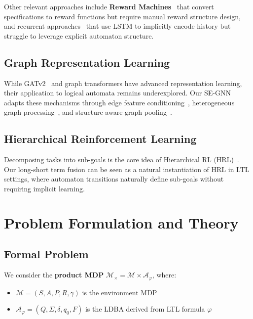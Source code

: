 \documentclass[conference]{IEEEtran}
\begin{document}
Other relevant approaches include \textbf{Reward Machines}~\cite{liu2021reward} that convert specifications to reward functions but require manual reward structure design, and recurrent approaches~\cite{he2022learning} that use LSTM to implicitly encode history but struggle to leverage explicit automaton structure.

\subsection{Graph Representation Learning}

While GATv2~\cite{velickovic2021gat} and graph transformers have advanced representation learning, their application to logical automata remains underexplored. Our SE-GNN adapts these mechanisms through edge feature conditioning~\cite{velickovic2021gat}, heterogeneous graph processing~\cite{wang2021deeper}, and structure-aware graph pooling~\cite{lee2022self}.

\subsection{Hierarchical Reinforcement Learning}

Decomposing tasks into sub-goals is the core idea of Hierarchical RL (HRL)~\cite{sutton1999between,nachum2018conditional}. Our long-short term fusion can be seen as a natural instantiation of HRL in LTL settings, where automaton transitions naturally define sub-goals without requiring implicit learning.

\section{Problem Formulation and Theory}
\label{sec:problem}

\subsection{Formal Problem}

We consider the \textbf{product MDP} $\mathcal{M}_\times = \mathcal{M} \times \mathcal{A}_\varphi$, where:
\begin{itemize}
    \item $\mathcal{M} = (S, A, P, R, \gamma)$ is the environment MDP
    \item $\mathcal{A}_\varphi = (Q, \Sigma, \delta, q_0, F)$ is the LDBA derived from LTL formula $\varphi$
\end{itemize}
\end{document}
